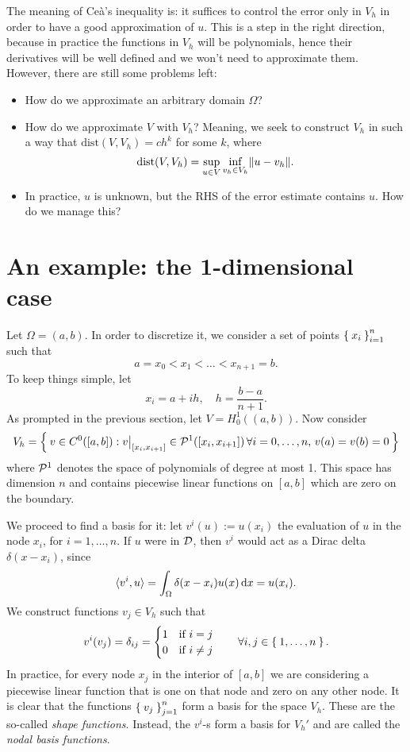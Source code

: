 The meaning of Ceà's inequality is: it suffices to control the error only in $V_h$ in order to have a good approximation of $u$. This is a step in the right direction, because in practice the functions in $V_h$ will be polynomials, hence their derivatives will be well defined and we won't need to approximate them. However, there are still some problems left:
\begin{itemize}
\item How do we approximate an arbitrary domain $\Omega$?
\item How do we approximate $V$ with $V_h$? Meaning, we seek to construct $V_h$ in such a way that $\text{dist}(V,V_h) = c h^k$ for some $k$, where
\[
\text{dist}(V,V_h) = \sup_{u\in V} \inf_{v_h \in V_h} \norm{u - v_h}.
\]
\item In practice, $u$ is unknown, but the RHS of the error estimate contains $u$. How do we manage this?
\end{itemize}



\section{An example: the 1-dimensional case}


Let $\Omega = (a,b)$. In order to discretize it, we consider a set of points $\Set{x_i}_{i=1}^n$ such that
\[
a = x_0 < x_1 < \dots < x_{n+1} = b.
\]
To keep things simple, let
\[
x_i = a+ih, \quad h = \frac{b-a}{n+1}.
\]
As prompted in the previous section, let $V=H_0^1((a,b))$. Now consider
\[
V_h = \Set{v \in C^0([a,b]): \restr{v}{[x_i, x_{i+1}]}\in \P^1([x_i, x_{i+1}]) \,\forall i=0,\dots,n, \, v(a)=v(b)=0}
\]
where $\P^1$ denotes the space of polynomials of degree at most 1. This space has dimension $n$ and contains piecewise linear functions on $[a,b]$ which are zero on the boundary.

We proceed to find a basis for it: let $v^i(u) := u(x_i)$ the evaluation of $u$ in the node $x_i$, for $i=1,\dots,n$. If $u$ were in $\D$, then $v^i$ would act as a Dirac delta $\delta(x-x_i)$, since
\[
\langle v^i, u \rangle = \int_\Omega \delta(x-x_i) u(x) \diff x = u(x_i).
\]
We construct functions $v_j \in V_h$ such that
\[
v^i(v_j) = \delta_{ij} = \begin{cases}
1 \quad \text{if } i=j \\
0 \quad \text{if } i\ne j
\end{cases}
\quad \forall i,j \in \Set{1,\dots,n}.
\]
In practice, for every node $x_j$ in the interior of $[a,b]$ we are considering a piecewise linear function that is one on that node and zero on any other node. It is clear that the functions $\Set{v_j}_{j=1}^{n}$ form a basis for the space $V_h$. These are the so-called \emph{shape functions}. Instead, the $v^i$-s form a basis for $V_h'$ and are called the \emph{nodal basis functions}.

